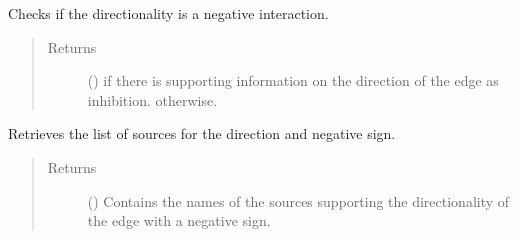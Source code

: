 \documentclass[letterpaper,10pt,english]{sphinxmanual}
\begin{document}
\begin{fulllineitems}
\begin{fulllineitems}
\begin{quote}
\begin{description}
\end{description}\end{quote}

\end{fulllineitems}


\begin{fulllineitems}
\label{\detokenize{reference:pypath.main.Direction.negative_reverse}}
Checks if the  directionality is a negative
interaction.
\begin{quote}\begin{description}
\item[{Returns}] \leavevmode
() \textendash{}  if there is supporting information on
the  direction of the edge as inhibition.
 otherwise.

\end{description}\end{quote}

\end{fulllineitems}


\begin{fulllineitems}
\label{\detokenize{reference:pypath.main.Direction.negative_sources_reverse}}
Retrieves the list of sources for the 
direction and negative sign.
\begin{quote}\begin{description}
\item[{Returns}] \leavevmode
() \textendash{} Contains the names of the sources supporting the
 directionality of the edge with a
negative sign.

\end{description}\end{quote}

\end{fulllineitems}


\end{fulllineitems}
\end{document}

